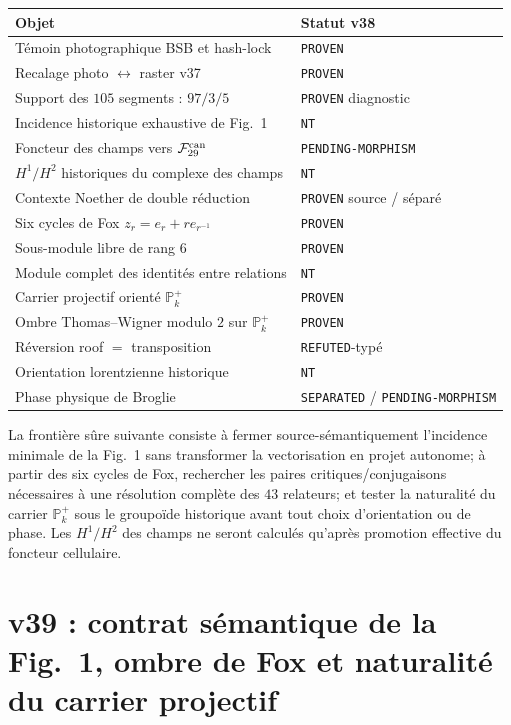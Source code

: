 \documentclass[11pt,a4paper]{article}
\newcommand{\certProven}{\texttt{PROVEN}}
\newcommand{\certRefuted}{\texttt{REFUTED}}
\newcommand{\certSeparated}{\texttt{SEPARATED}}
\newcommand{\certPending}{\texttt{PENDING-MORPHISM}}
\newcommand{\certNT}{\texttt{NT}}
\begin{document}
\begin{center}
\begin{tabularx}{\textwidth}{@{}Xl@{}}
\toprule
Objet & Statut v38\\
\midrule
Témoin photographique BSB et hash-lock & \certProven\\
Recalage photo $\leftrightarrow$ raster v37 & \certProven\\
Support des $105$ segments : $97/3/5$ & \certProven{} diagnostic\\
Incidence historique exhaustive de Fig.~1 & \certNT\\
Foncteur des champs vers $\mathcal F_{29}^{\rm can}$ & \certPending\\
$H^1/H^2$ historiques du complexe des champs & \certNT\\
Contexte Noether de double réduction & \certProven{} source / séparé\\
Six cycles de Fox $z_r=e_r+r e_{r^{-1}}$ & \certProven\\
Sous-module libre de rang $6$ & \certProven\\
Module complet des identités entre relations & \certNT\\
Carrier projectif orienté $\mathbb P_k^+$ & \certProven\\
Ombre Thomas--Wigner modulo $2$ sur $\mathbb P_k^+$ & \certProven\\
Réversion roof $=$ transposition & \certRefuted{}-typé\\
Orientation lorentzienne historique & \certNT\\
Phase physique de Broglie & \certSeparated{} / \certPending\\
\bottomrule
\end{tabularx}
\end{center}

La frontière sûre suivante consiste à fermer source-sémantiquement l'incidence minimale de la Fig.~1 sans transformer la vectorisation en projet autonome; à partir des six cycles de Fox, rechercher les paires critiques/conjugaisons nécessaires à une résolution complète des $43$ relateurs; et tester la naturalité du carrier $\mathbb P_k^+$ sous le groupoïde historique avant tout choix d'orientation ou de phase. Les $H^1/H^2$ des champs ne seront calculés qu'après promotion effective du foncteur cellulaire.


\section{v39 : contrat sémantique de la Fig.~1, ombre de Fox et naturalité du carrier projectif}\label{sec:v39-semantic-fox-groupoid}
\end{document}
